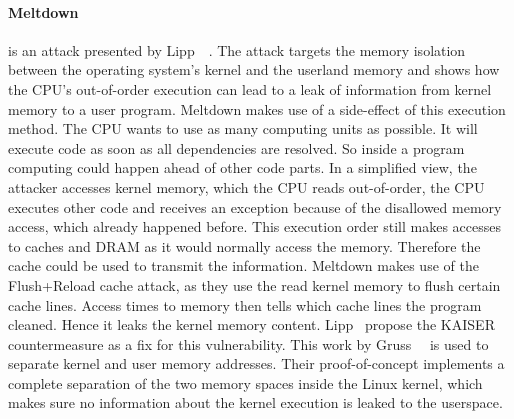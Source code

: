 \paragraph{Meltdown} is an attack presented by Lipp~\etal~\cite{meltdown}. The
attack targets the memory isolation between the operating system's kernel and
the userland memory and shows how the CPU's out-of-order execution can lead to a
leak of information from kernel memory to a user program. Meltdown makes use of
a side-effect of this execution method. The CPU wants to use as many computing
units as possible. It will execute code as soon as all dependencies are
resolved. So inside a program computing could happen ahead of other code parts.
In a simplified view, the attacker accesses kernel memory, which the CPU reads
out-of-order, the CPU executes other code and receives an exception because of
the disallowed memory access, which already happened before. This execution
order still makes accesses to caches and DRAM as it would normally access the
memory. Therefore the cache could be used to transmit the information. Meltdown
makes use of the Flush+Reload cache attack, as they use the read kernel memory
to flush certain cache lines. Access times to memory then tells which cache
lines the program cleaned. Hence it leaks the kernel memory content. Lipp~\etal
propose the KAISER countermeasure as a fix for this vulnerability. This work by
Gruss~\etal~\cite{kaiserpaper} is used to separate kernel and user memory
addresses. Their proof-of-concept implements a complete separation of the two
memory spaces inside the Linux kernel, which makes sure no information about the
kernel execution is leaked to the userspace.

